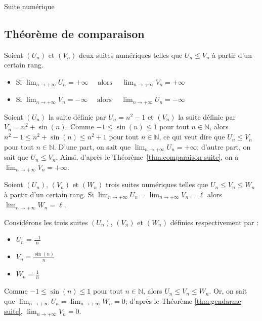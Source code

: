\begin{chapter}{Suite num\'erique}
\subsection{Th\'eor\`eme de comparaison}
%
\begin{thm}
\label{thm:comparaison suite}
Soient $(U_n)$ et $(V_n)$ deux suites num\'eriques telles que $U_n \leq V_n$ \`a partir d'un certain rang.
\begin{itemize} 
\item
      $
      \text{Si }
      \lim_{n \rightarrow + \infty} U_n = + \infty
      \quad
      \text{ alors }
      \quad
      \lim_{n \rightarrow + \infty} V_n = + \infty
      $
\item
      $
      \text{Si }
      \lim_{n \rightarrow + \infty} V_n = - \infty
      \quad
      \text{ alors }
      \quad
      \lim_{n \rightarrow + \infty} U_n = - \infty
      $
\end{itemize}
\end{thm}
\begin{ex}
Soient $(U_n)$ la suite d\'efinie par $U_n = n^2 - 1 $ et $(V_n)$ la suite d\'efinie par ${V_n = n^2 + \sin (n)}$.
Comme $-1 \leq \sin (n) \leq 1$ pour tout $n \in \mathbb{N}$, alors 
      $n^2 - 1 \leq n^2 + \sin (n) \leq n^2 + 1$ pour tout $n \in \mathbb{N}$, ce qui veut dire que 
      $U_n \leq V_n$ pour tout $n \in \mathbb{N}$.
D'une part, on sait que $\lim_{n \rightarrow + \infty} U_n = + \infty$; d'autre part, on sait que $U_n \leq V_n$.
Ainsi, d'apr\`es le Th\'eor\`eme~\ref{thm:comparaison suite}, on a $\lim_{n \rightarrow + \infty} V_n = + \infty$.
\end{ex}
%
\begin{thm}
\label{thm:gendarme suite}
Soient $(U_n)$, $(V_n)$ et $(W_n)$ trois suites num\'eriques telles que ${U_n \leq V_n \leq W_n}$ \`a partir d'un certain rang.
Si $\lim_{n \rightarrow + \infty} U_n = \lim_{n \rightarrow + \infty} V_n = \ell$ alors $\lim_{n \rightarrow + \infty} W_n = \ell$.
\end{thm}
\begin{ex}
Consid\'erons les trois suites $(U_n)$, $(V_n)$ et $(W_n)$ d\'efinies respectivement par : 
\begin{itemize} 
\item $ U_n = \frac{-1}{n} $
\item $ V_n = \frac{\sin(n)}{n} $
\item $ W_n = \frac{1}{n} $
\end{itemize}
Comme $-1 \leq \sin (n) \leq 1$ pour tout $n \in \mathbb{N}$, alors 
      $U_n \leq V_n \leq W_n$.
Or, on sait que $ \lim_{n \rightarrow + \infty} U_n = \lim_{n \rightarrow + \infty} W_n = 0$; d'apr\`es le Th\'eor\`eme \ref{thm:gendarme suite}, $ \lim_{n \rightarrow + \infty} V_n = 0 $.
\end{ex}
%

\end{chapter}
